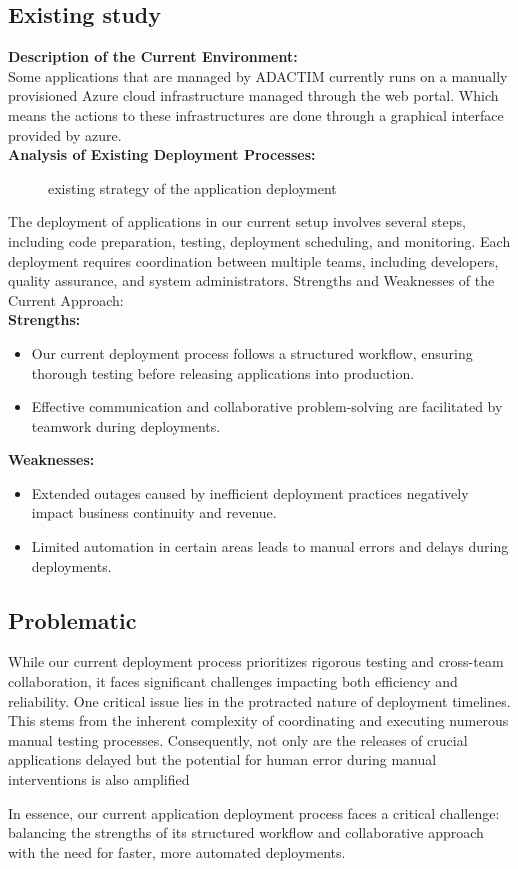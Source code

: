 \subsection{Existing study}
\noindent
\textbf{Description of the Current Environment:}
\\
Some applications that are managed by ADACTIM currently runs on a manually provisioned Azure cloud infrastructure managed through the web portal. Which means the actions to these infrastructures are done through a graphical interface provided by azure.
\\
\textbf{Analysis of Existing Deployment Processes:}

\begin{figure}[H]
    \centering
    \caption{existing strategy of the application deployment}
    \label{fig:existing_strategy}
\end{figure}

The deployment of applications in our current setup involves several steps, including code preparation, testing, deployment scheduling, and monitoring. Each deployment requires coordination between multiple teams, including developers, quality assurance, and system administrators.
Strengths and Weaknesses of the Current Approach:
\\
\textbf{Strengths:}
\begin{itemize}
    \item Our current deployment process follows a structured workflow, ensuring thorough testing before releasing applications into production.
    \item Effective communication and collaborative problem-solving are facilitated by teamwork during deployments.
\end{itemize}
\textbf{Weaknesses:}
\begin{itemize}
    \item Extended outages caused by inefficient deployment practices negatively impact business continuity and revenue.
    \item Limited automation in certain areas leads to manual errors and delays during deployments.
\end{itemize}
\noindent
\subsection{Problematic}
\par
While our current deployment process prioritizes rigorous testing and cross-team collaboration, it faces significant challenges impacting both efficiency and reliability. One critical issue lies in the protracted nature of deployment timelines. This stems from the inherent complexity of coordinating and executing numerous manual testing processes. Consequently, not only are the releases of crucial applications delayed but the potential for human error during manual interventions is also amplified
\par
In essence, our current application deployment process faces a critical challenge: balancing the strengths of its structured workflow and collaborative approach with the need for faster, more automated deployments.

